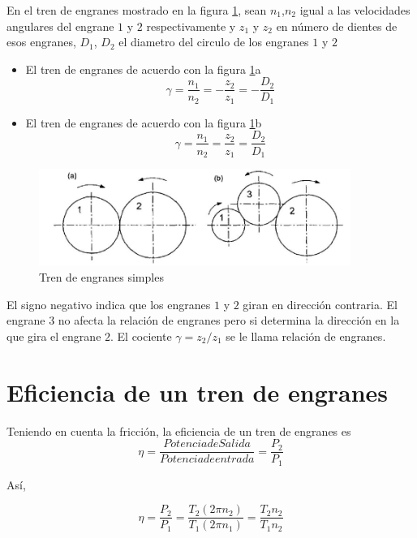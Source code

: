 \documentclass[12pt]{book}
\theoremstyle{definition}
\theoremstyle{remark}
\theoremstyle{plain}
\begin{document}
En el tren de engranes mostrado en la figura \ref{fig1}, sean $n_1$,$n_2$ igual a las velocidades angulares del engrane $1$ y $2$ respectivamente y $z_1$ y $z_2$ en número de dientes de esos engranes, $D_1$, $D_2$ el diametro del circulo de los engranes $1$ y $2$
\begin{itemize}
\item El tren de engranes de acuerdo con la figura \ref{fig1}a \\ \begin{equation}
\label{equ101} \gamma = \frac{n_1}{n_2} = - \frac{z_2}{z_1}=- \frac{D_2}{D_1} \end{equation}
\item El tren de engranes de acuerdo con la figura \ref{fig1}b \\ \begin{equation}
\label{equ102} \gamma = \frac{n_1}{n_2} =  \frac{z_2}{z_1}= \frac{D_2}{D_1} \end{equation}
\end{itemize}

\begin{figure}
\centering
\includegraphics[width=4in]{engranes.jpg}
\caption{Tren de engranes simples}
\label{fig1}
\end{figure}

El signo negativo indica que los engranes $1$ y $2$ giran en dirección contraria. El engrane $3$ no afecta la relación de engranes pero si determina la dirección en la que gira el engrane $2$. El cociente $\gamma = z_2/z_1$ se le llama relación de engranes.

\section{Eficiencia de un tren de engranes}

Teniendo en cuenta la fricción, la eficiencia de un tren de engranes es
\begin{equation}
\label{equ103}
\eta  =\frac{Potencia de Salida}{Potencia de entrada}= \frac{P_2}{P_1}
\end{equation}

Así,

\begin{equation}
\label{equ104}
\eta = \frac{P_2}{P_1} = \frac{T_2 (2 \pi n_2)}{T_1 (2 \pi n_1)}= \frac{T_2 n_2}{T_1 n_2}
\end{equation}
\end{document}
